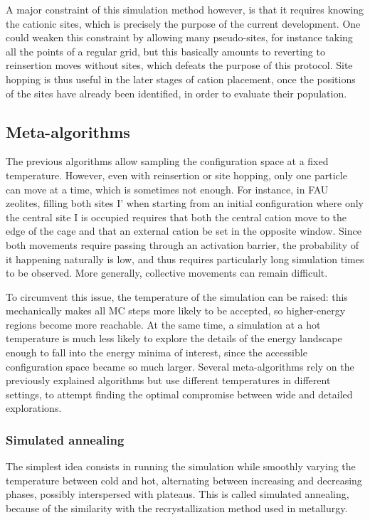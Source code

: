 \documentclass[main.tex]{subfiles}
\begin{document}
A major constraint of this simulation method however, is that it requires knowing the cationic sites, which is precisely the purpose of the current development. One could weaken this constraint by allowing many pseudo-sites, for instance taking all the points of a regular grid, but this basically amounts to reverting to reinsertion moves without sites, which defeats the purpose of this protocol. Site hopping is thus useful in the later stages of cation placement, once the positions of the sites have already been identified, in order to evaluate their population.


\subsection{Meta-algorithms}

The previous algorithms allow sampling the configuration space at a fixed temperature. However, even with reinsertion or site hopping, only one particle can move at a time, which is sometimes not enough. For instance, in FAU zeolites, filling both sites I' when starting from an initial configuration where only the central site I is occupied requires that both the central cation move to the edge of the cage and that an external cation be set in the opposite window. Since both movements require passing through an activation barrier, the probability of it happening naturally is low, and thus requires particularly long simulation times to be observed. More generally, collective movements can remain difficult.

To circumvent this issue, the temperature of the simulation can be raised: this mechanically makes all MC steps more likely to be accepted, so higher-energy regions become more reachable. At the same time, a simulation at a hot temperature is much less likely to explore the details of the energy landscape enough to fall into the energy minima of interest, since the accessible configuration space became so much larger. Several meta-algorithms rely on the previously explained algorithms but use different temperatures in different settings, to attempt finding the optimal compromise between wide and detailed explorations.

\subsubsection{Simulated annealing}

The simplest idea consists in running the simulation while smoothly varying the temperature between cold and hot, alternating between increasing and decreasing phases, possibly interspersed with plateaus. This is called simulated annealing, because of the similarity with the recrystallization method used in metallurgy.
\end{document}
